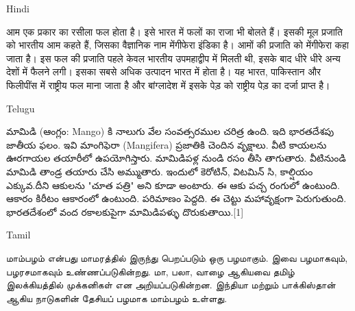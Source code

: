 \documentclass{article}
\newcommand\cheaderbox[1]{\colorbox{blue!12}{#1}}
\begin{document}
\newpage

\cheaderbox{Hindi}

आम एक प्रकार का रसीला फल होता है। इसे भारत में फलों का राजा भी बोलते हैं। इसकी मूल प्रजाति को भारतीय आम कहते हैं, जिसका वैज्ञानिक नाम मेंगीफेरा इंडिका है। आमों की प्रजाति को मेंगीफेरा कहा जाता है। इस फल की प्रजाति पहले केवल भारतीय उपमहाद्वीप में मिलती थी, इसके बाद धीरे धीरे अन्य देशों में फैलने लगी। इसका सबसे अधिक उत्पादन भारत में होता है। यह भारत, पाकिस्तान और फिलीपींस में राष्ट्रीय फल माना जाता है और बांग्लादेश में इसके पेड़ को राष्ट्रीय पेड़ का दर्जा प्राप्त है। 



\cheaderbox{Telugu}

మామిడి (ఆంగ్లం: Mango) కి నాలుగు వేల సంవత్సరముల చరిత్ర ఉంది. ఇది భారతదేశపు జాతీయ ఫలం. ఇవి మాంగిఫెరా (Mangifera) ప్రజాతికి చెందిన వృక్షాలు. వీటి కాయలను ఊరగాయల తయారీలో ఉపయోగిస్తారు. మామిడిపళ్ల నుండి రసం తీసి తాగుతారు. వీటినుండి మామిడి తాండ్ర తయారు చేసి అమ్ముతారు. ఇందులో కెరోటిన్, విటమిన్ సి, కాల్షియం ఎక్కువ.దీని ఆకులను "చూత పత్రి" అని కూడా అంటారు. ఈ ఆకు పచ్చ రంగులో ఉంటుంది. ఆకారం కిరీటం ఆకారంలో ఉంటుంది. పరిమాణం పెద్దది. ఈ చెట్టు మహావృక్షంగా పెరుగుతుంది. భారతదేశంలో వంద రకాలకుపైగా మామిడిపళ్ళు దొరుకుతాయి.[1] 


\cheaderbox{Tamil}

மாம்பழம் என்பது மாமரத்தில் இருந்து பெறப்படும் ஒரு பழமாகும். இவை பழமாகவும், பழரசமாகவும் உண்ணப்படுகின்றது. மா, பலா, வாழை ஆகியவை தமிழ் இலக்கியத்தில் முக்கனிகள் என அறியப்படுகின்றன. இந்தியா மற்றும் பாக்கிஸ்தான் ஆகிய நாடுகளின் தேசியப் பழமாக மாம்பழம் உள்ளது. 
\end{document}
